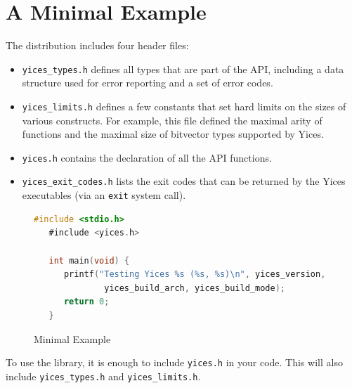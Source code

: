 \documentclass[11pt,twoside,fleqn,openright,titlepage]{cslreport}
\begin{document}
\section{A Minimal Example}

The distribution includes four header files:
\begin{itemize}
\item \texttt{yices\_types.h} defines all types that are part of the API,
including a data structure used for error reporting and a set of error codes.
\item \texttt{yices\_limits.h} defines a few constants that set hard
  limits on the sizes of various constructs. For example, this file
  defined the maximal arity of functions and the maximal size of
  bitvector types supported by Yices.
\item \texttt{yices.h} contains the declaration of all the API functions.
\item \texttt{yices\_exit\_codes.h} lists the exit codes that can be
  returned by the Yices executables (via an \texttt{exit} system call).
\end{itemize}

\begin{figure}
\begin{footnotesize}
\begin{lstlisting}[language=C,otherkeywords={\#include},keywordstyle=\color{blue},stringstyle=\color{red}]
   #include <stdio.h>
   #include <yices.h>

   int main(void) {
      printf("Testing Yices %s (%s, %s)\n", yices_version,
              yices_build_arch, yices_build_mode);
      return 0;
   }
\end{lstlisting}
\end{footnotesize}
\caption{Minimal Example}
\label{minimal}
\end{figure}

\noindent
To use the library, it is enough to include \texttt{yices.h} in your
code. This will also include \texttt{yices\_types.h} and
\texttt{yices\_limits.h}.
\end{document}
